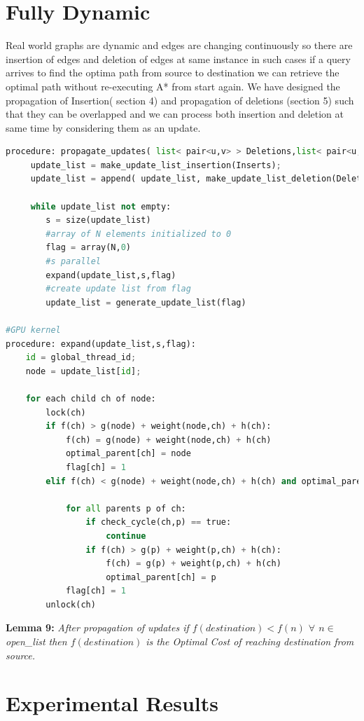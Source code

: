 \documentclass[a4paper]{article}
\begin{document}
\section{Fully Dynamic}
Real world graphs are dynamic and edges are changing continuously so there are insertion of edges and deletion of edges at same instance in such cases if a query arrives to find the optima path from source to destination we can retrieve the optimal path without re-executing A* from start again. We have designed the propagation of Insertion( section 4) and propagation of deletions (section 5) such that they can be overlapped and we can process both insertion and deletion at same time by considering them as an update.
\begin{lstlisting}[language=python, caption=Propagation of Updates]
procedure: propagate_updates( list< pair<u,v> > Deletions,list< pair<u,v> > Inserts, E, N):
     update_list = make_update_list_insertion(Inserts);
     update_list = append( update_list, make_update_list_deletion(Deletions) )
     
     while update_list not empty:
        s = size(update_list)
        #array of N elements initialized to 0
        flag = array(N,0)
        #s parallel
        expand(update_list,s,flag)
        #create update list from flag
        update_list = generate_update_list(flag)

#GPU kernel
procedure: expand(update_list,s,flag):
    id = global_thread_id;
    node = update_list[id];
    
    for each child ch of node:
        lock(ch)
        if f(ch) > g(node) + weight(node,ch) + h(ch):
            f(ch) = g(node) + weight(node,ch) + h(ch)  
            optimal_parent[ch] = node
            flag[ch] = 1
        elif f(ch) < g(node) + weight(node,ch) + h(ch) and optimal_parent[ch] == node:
            
            for all parents p of ch:
                if check_cycle(ch,p) == true:
                    continue
                if f(ch) > g(p) + weight(p,ch) + h(ch):
                    f(ch) = g(p) + weight(p,ch) + h(ch)
                    optimal_parent[ch] = p
            flag[ch] = 1
        unlock(ch)
\end{lstlisting}

\textbf{Lemma 9:} \textit{After propagation of updates if $f(destination) < f(n)$ $ \forall$ $n \in $open\_list then $f(destination)$ is the Optimal Cost of reaching destination from source.}

\section{Experimental Results}
\end{document}
